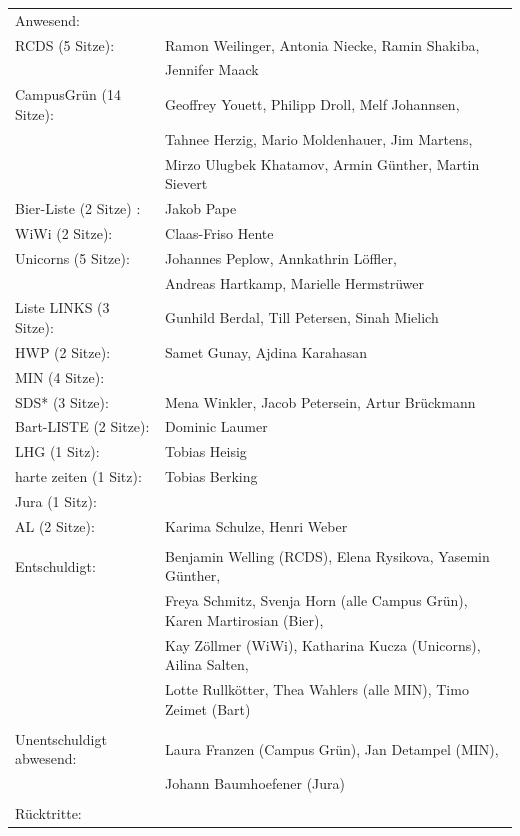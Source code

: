 \documentclass[ngerman,headheight=70pt]{scrartcl}
\begin{document}
    \begin{tabular}{ll}
        Anwesend: & \\
            RCDS (5 Sitze): & Ramon Weilinger, Antonia Niecke, Ramin Shakiba, \\
                            & Jennifer Maack \\
             CampusGrün (14 Sitze): & Geoffrey Youett, Philipp Droll, Melf Johannsen, \\
                                   & Tahnee Herzig, Mario Moldenhauer, Jim Martens,\\
                                   & Mirzo Ulugbek Khatamov, Armin Günther, Martin Sievert\\
             Bier-Liste (2 Sitze) : & Jakob Pape \\
             WiWi (2 Sitze): & Claas-Friso Hente \\
             Unicorns (5 Sitze): & Johannes Peplow, Annkathrin Löffler, \\
                                 & Andreas Hartkamp, Marielle Hermstrüwer \\
             Liste LINKS (3 Sitze): & Gunhild Berdal, Till Petersen, Sinah Mielich \\
             HWP (2 Sitze): & Samet Gunay, Ajdina Karahasan \\
             MIN (4 Sitze): & \\
             SDS* (3 Sitze): & Mena Winkler, Jacob Petersein, Artur Brückmann \\
             Bart-LISTE (2 Sitze): & Dominic Laumer \\
             LHG (1 Sitz): & Tobias Heisig \\
             harte zeiten (1 Sitz): & Tobias Berking \\
             Jura (1 Sitz): & \\
             AL (2 Sitze): & Karima Schulze, Henri Weber \\
            & \\
        Entschuldigt: & Benjamin Welling (RCDS), Elena Rysikova, Yasemin Günther,\\
                      & Freya Schmitz, Svenja Horn (alle Campus Grün), Karen Martirosian (Bier), \\
                      & Kay Zöllmer (WiWi), Katharina Kucza (Unicorns), Ailina Salten, \\
                      & Lotte Rullkötter, Thea Wahlers (alle MIN), Timo Zeimet (Bart)\\
                      &\\
        Unentschuldigt abwesend: & Laura Franzen (Campus Grün), Jan Detampel (MIN), \\
                                & Johann Baumhoefener (Jura)\\
                                &\\
        Rücktritte: & \\
    \end{tabular}
\end{document}
